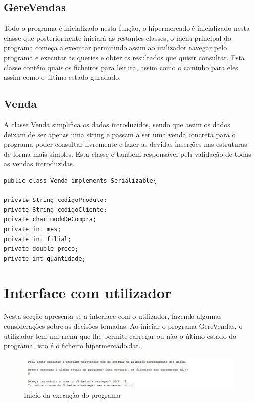 \section{GereVendas}

Todo o programa é inicializado nesta função, o hipermercado é inicializado nesta classe que posteriormente iniciará as restantes classes, o menu principal do programa começa  a executar permitindo assim ao utilizador navegar pelo programa e executar as queries e obter os resultados que quiser consultar.
Esta classe contém quais os ficheiros para leitura, assim como o caminho para eles assim como o último estado guradado. 

\section{Venda}

A classe Venda simplifica os dados introduzidos, sendo que assim os dados deixam de ser apenas uma string e passam a ser uma venda concreta para o programa poder consultar livremente e fazer as devidas inserções nas estruturas de forma mais simples.
Esta classe é tambem responsável pela validação de todas as vendas introduzidas.


\begin{verbatim}
public class Venda implements Serializable{

private String codigoProduto;
private String codigoCliente;
private char modoDeCompra;
private int mes;
private int filial;
private double preco;
private int quantidade;
\end{verbatim}



\chapter{Interface com utilizador}

Nesta secção apresenta-se a interface com o utilizador, fazendo algumas considerações sobre as decisões tomadas.
Ao iniciar o programa GereVendas, o utilizador tem um menu que lhe permite carregar ou não o último estado do programa, isto é o ficheiro hipermercado.dat. 

\begin{figure}[h!]
	\includegraphics[scale=1]{IntroduzirUmFicheiroStream.jpg}  
	\caption{Inicio da execução do programa }  
\end{figure}

